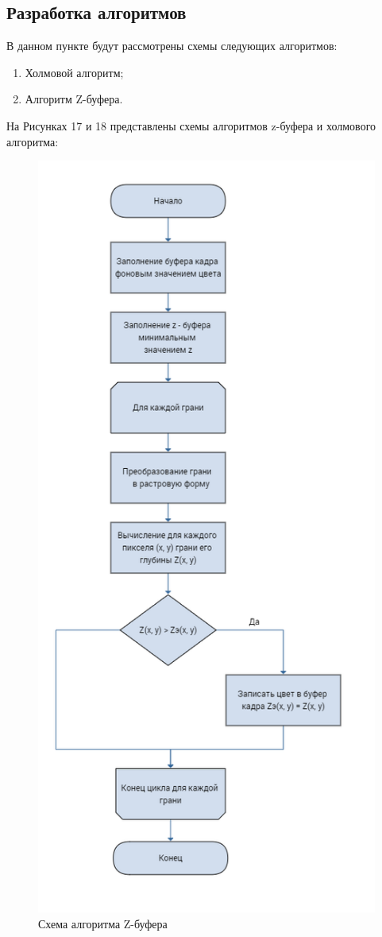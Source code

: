 \documentclass[a4paper, 10pt]{article}
\begin{document}
	 \subsection{Разработка алгоритмов}
	 В данном пункте будут рассмотрены схемы следующих алгоритмов:
	 \begin{enumerate}
	 	\item Холмовой алгоритм;
	 	\item Алгоритм Z-буфера.
	 \end{enumerate}
	На Рисунках 17 и 18 представлены схемы алгоритмов z-буфера и  холмового алгоритма:
	\clearpage
	\newpage
	\begin{figure}[h!]
		\centering
		\includegraphics[scale=0.6]{z-buff}
		\centering\caption{Схема алгоритма Z-буфера}
	\end{figure}
\end{document}
